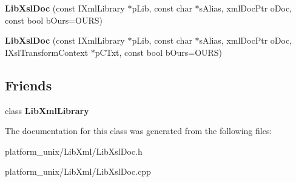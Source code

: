 \begin{DoxyCompactItemize}
\item 
\hypertarget{classgeneral__server_1_1LibXslDoc_a22a78c5bc6efad1fb07f48e2a26a4170}{{\bfseries \-Lib\-Xsl\-Doc} (const \-I\-Xml\-Library $\ast$p\-Lib, const char $\ast$s\-Alias, xml\-Doc\-Ptr o\-Doc, const bool b\-Ours=\-O\-U\-R\-S)}\label{classgeneral__server_1_1LibXslDoc_a22a78c5bc6efad1fb07f48e2a26a4170}

\item 
\hypertarget{classgeneral__server_1_1LibXslDoc_a46e6a47c91f014f9c17c62c6d29d60de}{{\bfseries \-Lib\-Xsl\-Doc} (const \-I\-Xml\-Library $\ast$p\-Lib, const char $\ast$s\-Alias, xml\-Doc\-Ptr o\-Doc, \-I\-Xsl\-Transform\-Context $\ast$p\-C\-Txt, const bool b\-Ours=\-O\-U\-R\-S)}\label{classgeneral__server_1_1LibXslDoc_a46e6a47c91f014f9c17c62c6d29d60de}

\end{DoxyCompactItemize}
\subsection*{\-Friends}
\begin{DoxyCompactItemize}
\item 
\hypertarget{classgeneral__server_1_1LibXslDoc_ab76a8c8b514e08e13c811de729a94ce4}{class {\bfseries \-Lib\-Xml\-Library}}\label{classgeneral__server_1_1LibXslDoc_ab76a8c8b514e08e13c811de729a94ce4}

\end{DoxyCompactItemize}


\-The documentation for this class was generated from the following files\-:\begin{DoxyCompactItemize}
\item 
platform\-\_\-unix/\-Lib\-Xml/\-Lib\-Xsl\-Doc.\-h\item 
platform\-\_\-unix/\-Lib\-Xml/\-Lib\-Xsl\-Doc.\-cpp\end{DoxyCompactItemize}
